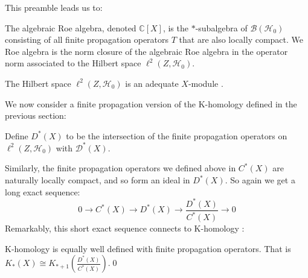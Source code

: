 This preamble leads us to:

\begin{definition}
The algebraic Roe algebra, denoted $\mathbb{C}[X]$, is the $*$-subalgebra of $\mathcal{B}(\mathcal{H}_{0})$ consisting of all finite propagation operators $T$ that are also locally compact. We Roe algebra is the norm closure of the algebraic Roe algebra in the operator norm associated to the Hilbert space $\ell^{2}(Z,\mathcal{H}_{0})$.
\end{definition}

\begin{remark}
The Hilbert space $\ell^{2}(Z,\mathcal{H_{0}})$ is an adequate $X$-module \cite{explg1}.
\end{remark}

We now consider a finite propagation version of the K-homology defined in the previous section:

\begin{definition}
Define $D^{*}(X)$ to be the intersection of the finite propagation operators on $\ell^{2}(Z,\mathcal{H_{0}})$ with $\mathcal{D}^{*}(X)$. 
\end{definition}
Similarly, the finite propagation operators we defined above in $C^{*}(X)$ are naturally locally compact, and so form an ideal in $D^{*}(X)$. So again we get a long exact sequence:
\begin{equation*}
0 \rightarrow C^{*}(X) \rightarrow D^{*}(X) \rightarrow \frac{D^{*}(X)}{C^{*}(X)}\rightarrow 0
\end{equation*} 
Remarkably, this short exact sequence connects to K-homology \cite{MR1399087,MR1817560}:
\begin{theorem}\label{Thm:Khom}
K-homology is equally well defined with finite propagation operators. That is $K_{*}(X)\cong K_{*+1}( \frac{D^{*}(X)}{C^{*}(X)})$.\qed
\end{theorem}

